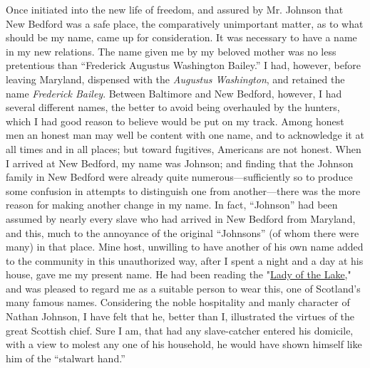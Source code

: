 Once initiated into the new life of freedom, and assured by Mr. Johnson
that New Bedford was a safe place, the comparatively unimportant matter,
as to what should be my name, came up for consideration. It was
necessary to have a name in my new relations. The name given me by my
beloved mother was no less pretentious than ``Frederick Augustus
Washington Bailey.'' I had, however, before leaving Maryland, dispensed
with the \emph{Augustus Washington}, and retained the name
\emph{Frederick Bailey}. Between Baltimore and New Bedford, however, I
had several different names, the better to avoid being overhauled by the
hunters, which I had good reason to believe would be put on my track.
Among honest men an honest man may well be content with one name, and to
acknowledge it at all times and in all places; but toward fugitives,
Americans are not {}honest. When I arrived at New Bedford, my name was
Johnson; and finding that the Johnson family in New Bedford were already
quite numerous---sufficiently so to produce some confusion in attempts
to distinguish one from another---there was the more reason for making
another change in my name. In fact, ``Johnson'' had been assumed by
nearly every slave who had arrived in New Bedford from Maryland, and
this, much to the annoyance of the original ``Johnsons'' (of whom there
were many) in that place. Mine host, unwilling to have another of his
own name added to the community in this unauthorized way, after I spent
a night and a day at his house, gave me my present name. He had been
reading the "\href{/wiki/The_Lady_of_the_Lake}{Lady of the Lake}," and
was pleased to regard me as a suitable person to wear this, one of
Scotland's many famous names. Considering the noble hospitality and
manly character of Nathan Johnson, I have felt that he, better than I,
illustrated the virtues of the great Scottish chief. Sure I am, that had
any slave-catcher entered his domicile, with a view to molest any one of
his household, he would have shown himself like him of the ``stalwart
hand.''

